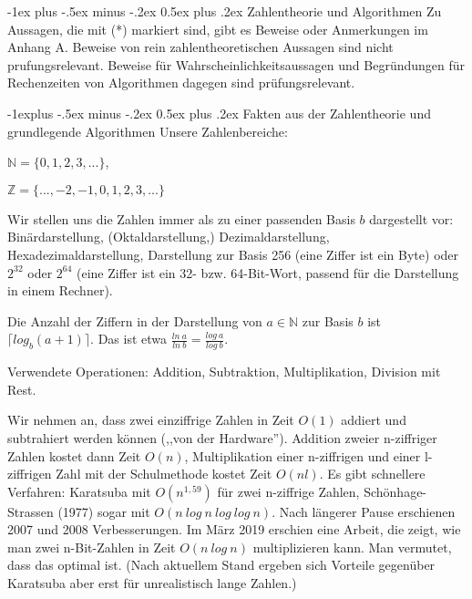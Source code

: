 \documentclass[a4paper]{article}
\makeatletter
\renewcommand{\section}{\@startsection{section}{1}{0mm}%
 {-1ex plus -.5ex minus -.2ex}%
 {0.5ex plus .2ex}%
 {\normalfont\large\bfseries}}
\renewcommand{\subsection}{\@startsection{subsection}{2}{0mm}%
 {-1explus -.5ex minus -.2ex}%
 {0.5ex plus .2ex}%
 {\normalfont\normalsize\bfseries}}
\makeatother
\begin{document}
\begin{multicols}{3}
    \section{Zahlentheorie und Algorithmen}
    Zu Aussagen, die mit (*) markiert sind, gibt es Beweise oder Anmerkungen im Anhang A. Beweise von rein zahlentheoretischen Aussagen sind nicht prufungsrelevant. Beweise für Wahrscheinlichkeitsaussagen und Begründungen für Rechenzeiten von Algorithmen dagegen sind prüfungsrelevant.

    \subsection{Fakten aus der Zahlentheorie und grundlegende Algorithmen}
    Unsere Zahlenbereiche:
    \begin{itemize*}
        \item $\mathbb{N}=\{ 0 , 1 , 2 , 3 ,...\}$,
        \item $\mathbb{Z}=\{...,- 2 ,- 1 , 0 , 1 , 2 , 3 ,...\}$
    \end{itemize*}

    Wir stellen uns die Zahlen immer als zu einer passenden Basis $b$ dargestellt vor: Binärdarstellung, (Oktaldarstellung,) Dezimaldarstellung, Hexadezimaldarstellung, Darstellung zur Basis 256 (eine Ziffer ist ein Byte) oder $2^{32}$ oder $2^{64}$ (eine Ziffer ist ein 32- bzw. 64-Bit-Wort, passend für die Darstellung in einem Rechner).

    Die Anzahl der Ziffern in der Darstellung von $a\in\mathbb{N}$ zur Basis $b$ ist $\lceil log_b(a+1)\rceil$. Das ist etwa $\frac{ln\ a}{ln\ b}=\frac{log\ a}{log\ b}$.

    Verwendete Operationen: Addition, Subtraktion, Multiplikation, Division mit Rest.

    Wir nehmen an, dass zwei einziffrige Zahlen in Zeit $O(1)$ addiert und subtrahiert werden können (,,von der Hardware''). Addition zweier n-ziffriger Zahlen kostet dann Zeit $O(n)$, Multiplikation einer n-ziffrigen und einer l-ziffrigen Zahl mit der Schulmethode kostet Zeit $O(nl)$. Es gibt schnellere Verfahren: Karatsuba mit $O(n^{1,59})$ für zwei n-ziffrige Zahlen, Schönhage-Strassen (1977) sogar mit $O(n\ log\ n\ log\ log\ n)$. Nach längerer Pause erschienen 2007 und 2008 Verbesserungen. Im März 2019 erschien eine Arbeit, die zeigt, wie man zwei n-Bit-Zahlen in Zeit $O(n\ log\ n)$ multiplizieren kann. Man vermutet, dass das optimal ist. (Nach aktuellem Stand ergeben sich Vorteile gegenüber Karatsuba aber erst für unrealistisch lange Zahlen.)


\end{multicols}
\end{document}
